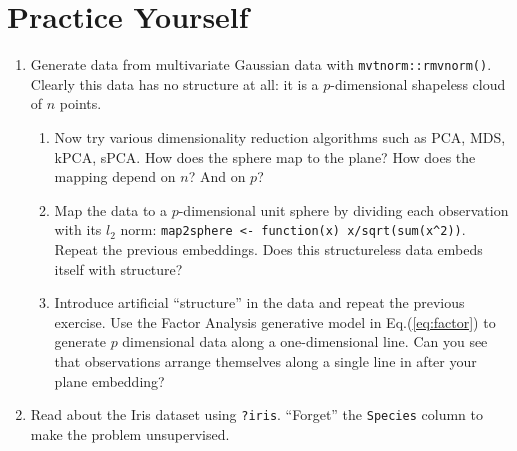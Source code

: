 \documentclass[]{book}
\providecommand{\tightlist}{%
  \setlength{\itemsep}{0pt}\setlength{\parskip}{0pt}}
\theoremstyle{definition}
\theoremstyle{definition}
\theoremstyle{definition}
\theoremstyle{remark}
\begin{document}
\hypertarget{practice-yourself-7}{%
\section{Practice Yourself}\label{practice-yourself-7}}

\begin{enumerate}
\def\labelenumi{\arabic{enumi}.}
\tightlist
\item
  Generate data from multivariate Gaussian data with \texttt{mvtnorm::rmvnorm()}. Clearly this data has no structure at all: it is a \(p\)-dimensional shapeless cloud of \(n\) points.

  \begin{enumerate}
  \def\labelenumii{\arabic{enumii}.}
  \tightlist
  \item
    Now try various dimensionality reduction algorithms such as PCA, MDS, kPCA, sPCA. How does the sphere map to the plane? How does the mapping depend on \(n\)? And on \(p\)?
  \item
    Map the data to a \(p\)-dimensional unit sphere by dividing each observation with its \(l_2\) norm: \texttt{map2sphere\ \textless{}-\ function(x)\ x/sqrt(sum(x\^{}2))}. Repeat the previous embeddings. Does this structureless data embeds itself with structure?
  \item
    Introduce artificial ``structure'' in the data and repeat the previous exercise. Use the Factor Analysis generative model in Eq.(\eqref{eq:factor}) to generate \(p\) dimensional data along a one-dimensional line. Can you see that observations arrange themselves along a single line in after your plane embedding?
  \end{enumerate}
\item
  Read about the Iris dataset using \texttt{?iris}. ``Forget'' the \texttt{Species} column to make the problem unsupervised.


\end{enumerate}
\end{document}
